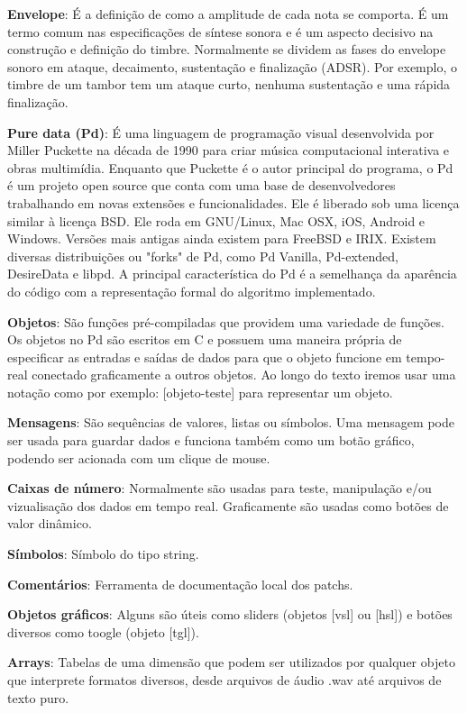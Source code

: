 \documentclass{ppgmus}
\begin{document}
\textbf{Envelope}: É a definição de como a amplitude de cada nota se comporta.
É um termo comum nas especificações de síntese sonora e é um aspecto decisivo na construção e 
definição do timbre. Normalmente se dividem as fases do
envelope sonoro em ataque, decaimento, sustentação e finalização (ADSR). Por
exemplo, o timbre de um tambor tem um ataque curto, nenhuma sustentação
e uma rápida finalização.

\textbf{Pure data (Pd)}: É uma linguagem de programação visual desenvolvida por Miller Puckette na década de 1990 
para criar música computacional interativa e obras multimídia. Enquanto que Puckette é o autor principal do programa, 
o Pd é um projeto open source que conta com uma base de desenvolvedores trabalhando em novas extensões e funcionalidades.
Ele é liberado sob uma licença similar à licença BSD. Ele roda em GNU/Linux, Mac OSX, iOS, Android e Windows. 
Versões mais antigas ainda existem para FreeBSD e IRIX. Existem diversas distribuições ou "forks" de Pd, como 
Pd Vanilla, Pd-extended, DesireData e libpd. A principal característica do Pd é a semelhança da aparência do código com
a representação formal do algoritmo implementado.


\textbf{Objetos}: São funções pré-compiladas que providem uma variedade de funções.
Os objetos no Pd são escritos em C e possuem uma maneira própria de especificar as entradas e saídas
de dados para que o objeto funcione em tempo-real conectado graficamente a outros objetos.
Ao longo do texto iremos usar uma notação como por exemplo: [objeto-teste] para
representar um objeto.

\textbf{Mensagens}: São sequências de valores, listas ou símbolos. Uma mensagem pode ser usada para
guardar dados e funciona também como um botão gráfico, podendo ser acionada com um clique de mouse.

\textbf{Caixas de número}: Normalmente são usadas para teste, manipulação e/ou vizualisação
dos dados em tempo real. Graficamente são usadas como botões de valor dinâmico.

\textbf{Símbolos}: Símbolo do tipo string.

\textbf{Comentários}: Ferramenta de documentação local dos patchs.

\textbf{Objetos gráficos}: Alguns são úteis como sliders (objetos [vsl] ou [hsl])  e botões diversos como
toogle (objeto [tgl]).

\textbf{Arrays}: Tabelas de uma dimensão que podem ser utilizados por qualquer objeto
que interprete formatos diversos, desde arquivos de áudio .wav até arquivos de 
texto puro.
\end{document}
